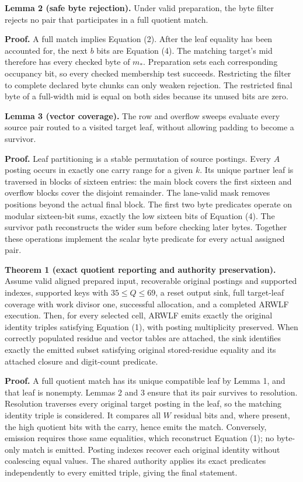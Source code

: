 \documentclass[manuscript,screen,review]{acmart}
\begin{document}
\textbf{Lemma 2 (safe byte rejection).} Under valid preparation, the byte filter rejects no pair that participates in a full quotient match.

\textbf{Proof.} A full match implies Equation (2). After the leaf equality has been accounted for, the next $b$ bits are Equation (4). The matching target's mid therefore has every checked byte of $m_*$. Preparation sets each corresponding occupancy bit, so every checked membership test succeeds. Restricting the filter to complete declared byte chunks can only weaken rejection. The restricted final byte of a full-width mid is equal on both sides because its unused bits are zero.

\textbf{Lemma 3 (vector coverage).} The row and overflow sweeps evaluate every source pair routed to a visited target leaf, without allowing padding to become a survivor.

\textbf{Proof.} Leaf partitioning is a stable permutation of source postings. Every $A$ posting occurs in exactly one carry range for a given $k$. Its unique partner leaf is traversed in blocks of sixteen entries: the main block covers the first sixteen and overflow blocks cover the disjoint remainder. The lane-valid mask removes positions beyond the actual final block. The first two byte predicates operate on modular sixteen-bit sums, exactly the low sixteen bits of Equation (4). The survivor path reconstructs the wider sum before checking later bytes. Together these operations implement the scalar byte predicate for every actual assigned pair.

\textbf{Theorem 1 (exact quotient reporting and authority preservation).} Assume valid aligned prepared input, recoverable original postings and supported indexes, supported keys with $35\leq Q\leq69$, a reset output sink, full target-leaf coverage with work divisor one, successful allocation, and a completed ARWLF execution. Then, for every selected cell, ARWLF emits exactly the original identity triples satisfying Equation (1), with posting multiplicity preserved. When correctly populated residue and vector tables are attached, the sink identifies exactly the emitted subset satisfying original stored-residue equality and its attached closure and digit-count predicate.

\textbf{Proof.} A full quotient match has its unique compatible leaf by Lemma 1, and that leaf is nonempty. Lemmas 2 and 3 ensure that its pair survives to resolution. Resolution traverses every original target posting in the leaf, so the matching identity triple is considered. It compares all $W$ residual bits and, where present, the high quotient bits with the carry, hence emits the match. Conversely, emission requires those same equalities, which reconstruct Equation (1); no byte-only match is emitted. Posting indexes recover each original identity without coalescing equal values. The shared authority applies its exact predicates independently to every emitted triple, giving the final statement.
\end{document}
